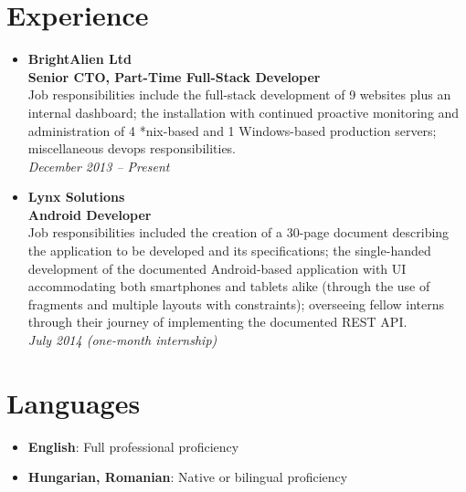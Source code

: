 \documentclass[11pt,a4paper]{article}
\begin{document}
\section*{Experience}
	\begin{itemize}
	\item	{\large\textbf{BrightAlien Ltd}}\\
			\textbf{Senior CTO, Part-Time Full-Stack Developer}\\
			Job responsibilities include the full-stack development of 9 websites plus an internal dashboard; the installation with continued proactive monitoring and administration of 4 *nix-based and 1 Windows-based production servers; miscellaneous devops responsibilities.\\
			\textit{December 2013 – Present}
	\item	{\large\textbf{Lynx Solutions}}\\
			\textbf{Android Developer}\\
			Job responsibilities included the creation of a 30-page document describing the application to be developed and its specifications; the single-handed development of the documented Android-based application with UI accommodating both smartphones and tablets alike (through the use of fragments and multiple layouts with constraints); overseeing fellow interns through their journey of implementing the documented REST API.\\
			\textit{July 2014 (one-month internship)}
	\end{itemize}

\section*{Languages}
	\begin{itemize}
		\item	{\large\textbf{English}}: Full professional proficiency
		\item	{\large\textbf{Hungarian, Romanian}}: Native or bilingual proficiency
	\end{itemize}

\newpage
\end{document}
